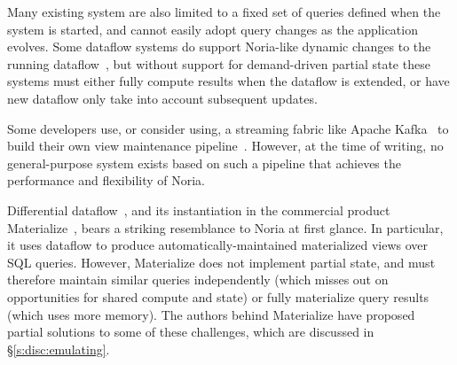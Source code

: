 Many existing system are also limited to a fixed set of queries defined when the
system is started, and cannot easily adopt query changes as the application
evolves. Some dataflow systems do support Noria-like dynamic changes to the
running dataflow~\cite{ciel, ray}, but without support for demand-driven partial
state these systems must either fully compute results when the dataflow is
extended, or have new dataflow only take into account subsequent updates.

Some developers use, or consider using, a streaming fabric like Apache
Kafka~\cite{kafka} to build their own view maintenance pipeline~\cite{nyt-kafka,
samza-blogpost}. However, at the time of writing, no general-purpose system
exists based on such a pipeline that achieves the performance and flexibility of
Noria.

Differential dataflow~\cite{differential-dataflow}, and its instantiation in the
commercial product Materialize~\cite{materialize}, bears a striking resemblance
to Noria at first glance. In particular, it uses dataflow to produce
automatically-maintained materialized views over SQL queries. However,
Materialize does not implement partial state, and must therefore maintain
similar queries independently (which misses out on opportunities for shared
compute and state) or fully materialize query results (which uses more memory).
The authors behind Materialize have proposed partial solutions to some of these
challenges, which are discussed in \S\vref{s:disc:emulating}.
